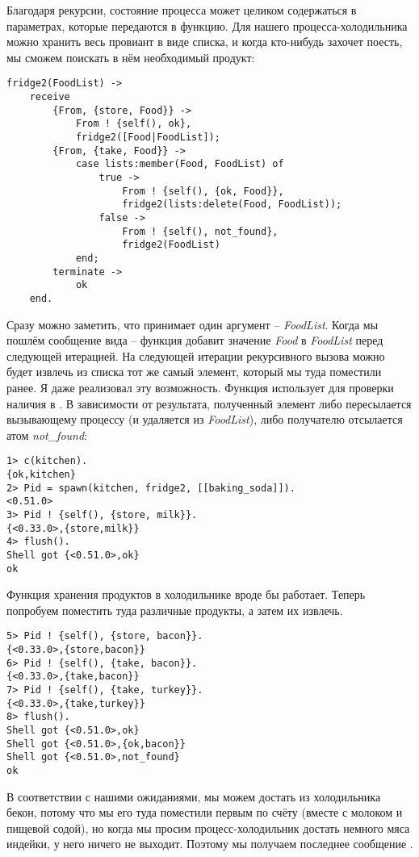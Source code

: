 Благодаря рекурсии, состояние процесса может целиком содержаться в параметрах, которые передаются в функцию.
Для нашего процесса\--холодильника можно хранить весь провиант в виде списка, и когда кто\--нибудь захочет поесть, мы сможем поискать в нём необходимый продукт:
\begin{lstlisting}[style=erlang]
fridge2(FoodList) ->
    receive
        {From, {store, Food}} ->
            From ! {self(), ok},
            fridge2([Food|FoodList]);
        {From, {take, Food}} ->
            case lists:member(Food, FoodList) of
                true ->
                    From ! {self(), {ok, Food}},
                    fridge2(lists:delete(Food, FoodList));
                false ->
                    From ! {self(), not_found},
                    fridge2(FoodList)
            end;
        terminate ->
            ok
    end.
\end{lstlisting}

Сразу можно заметить, что  принимает один аргумент \--- \emph{FoodList}.
Когда мы пошлём сообщение вида  \--- функция добавит значение \emph{Food} в \emph{FoodList} перед следующей итерацией.
На следующей итерации рекурсивного вызова можно будет извлечь из списка тот же самый элемент, который мы туда поместили ранее.
Я даже реализовал эту возможность.
Функция использует  для проверки наличия  в .
В зависимости от результата, полученный элемент либо пересылается вызывающему процессу (и удаляется из \emph{FoodList}), либо получателю отсылается атом \emph{not\_found}:
\begin{lstlisting}[style=erlang]
1> c(kitchen).
{ok,kitchen}
2> Pid = spawn(kitchen, fridge2, [[baking_soda]]).
<0.51.0>
3> Pid ! {self(), {store, milk}}.
{<0.33.0>,{store,milk}}
4> flush().
Shell got {<0.51.0>,ok}
ok
\end{lstlisting}

Функция хранения продуктов в холодильнике вроде бы работает.
Теперь попробуем поместить туда различные продукты, а затем их извлечь.
\begin{lstlisting}[style=erlang]
5> Pid ! {self(), {store, bacon}}.
{<0.33.0>,{store,bacon}}
6> Pid ! {self(), {take, bacon}}.
{<0.33.0>,{take,bacon}}
7> Pid ! {self(), {take, turkey}}.
{<0.33.0>,{take,turkey}}
8> flush().
Shell got {<0.51.0>,ok}
Shell got {<0.51.0>,{ok,bacon}}
Shell got {<0.51.0>,not_found}
ok
\end{lstlisting}

В соответствии с нашими ожиданиями, мы можем достать из холодильника бекон, потому что мы его туда поместили первым по счёту (вместе с молоком и пищевой содой), но когда мы просим процесс\--холодильник достать немного мяса индейки, у него ничего не выходит.
Поэтому мы получаем последнее сообщение .

